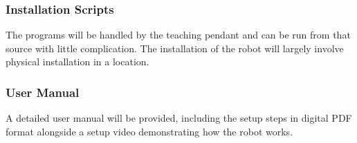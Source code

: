 \subsubsection{Installation Scripts}
The programs will be handled by the teaching pendant and can be run from that source with little complication. The installation of the robot will largely involve physical installation in a location.

\subsubsection{User Manual}
A detailed user manual will be provided, including the setup steps in digital PDF format alongside a setup video demonstrating how the robot works. 